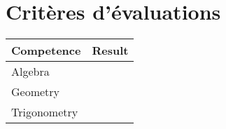 \section*{Critères d'évaluations}

\begin{tabular}{|l|l|}
\hline
Competence & Result \\
\hline
Algebra & \\
Geometry & \\
Trigonometry & \\
\hline
\end{tabular}



